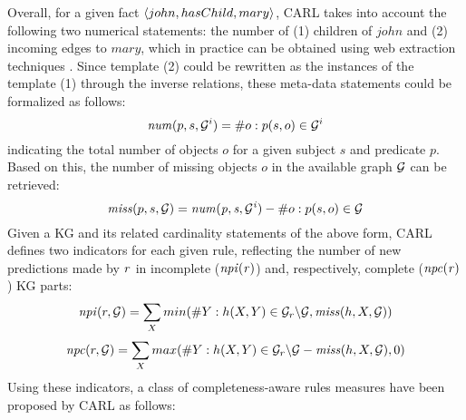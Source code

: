 Overall, for a given fact $\langle john, hasChild, mary\rangle$, CARL takes into account the following two numerical statements: the number of (1) children of $john$ and (2) incoming edges to $mary$, which in practice can be obtained using web extraction techniques \cite{cardinality-extraction-iswc-2016}. Since template (2) could be rewritten as the instances of the template (1) through the inverse relations, these meta-data statements could be formalized as follows:
\[\mathit{num}(p,s, \mathcal{G}^i) = \# o : p(s,o) \in \mathcal{G}^i\]
indicating the total number of objects $o$ for a given subject $s$ and predicate $p$. Based on this, the number of missing objects $o$ in the available graph $\mathcal{G}$ can be retrieved:
\[\mathit{miss}(p,s,\mathcal{G}) = \mathit{num(p,s,\mathcal{G}^i)} - \#o : p(s,o) \in \mathcal{G}\]
Given a KG and its related cardinality statements of the above form, CARL defines two indicators for each given rule, reflecting the number of new 
predictions made by $\mathit{r}$ in incomplete ($\mathit{npi(r)}$) and, respectively, complete ($\mathit{npc(r)}$) KG parts:
\begin{align*}
\mathit{npi}(r, \mathcal{G}) = \sum_X min(\#Y: h(X,Y)\in \mathcal{G}_r\backslash \mathcal{G}, \mathit{miss}(h,X,\mathcal{G}))
\end{align*}
\vspace{-\topsep}
\vspace{-\topsep}
\begin{align*}
\mathit{npc}(r, \mathcal{G}) = \sum_X max(\#Y: h(X,Y)\in\mathcal{G}_r\backslash \mathcal{G} - \mathit{miss}(h,X,\mathcal{G}), 0)
\end{align*}
Using these indicators, a class of completeness-aware rules measures have been proposed by CARL as follows:
